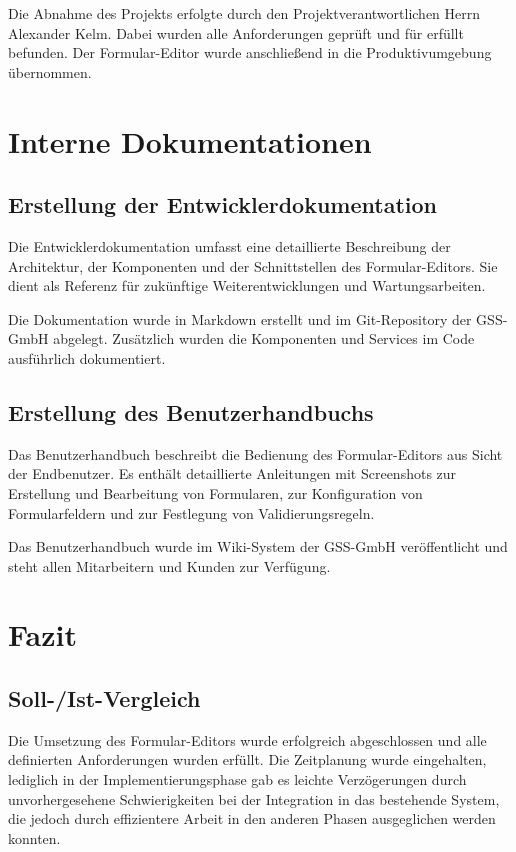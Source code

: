 \documentclass[a4paper,11pt]{article}
\begin{document}
Die Abnahme des Projekts erfolgte durch den Projektverantwortlichen Herrn Alexander Kelm. Dabei wurden alle Anforderungen geprüft und für erfüllt befunden. Der Formular-Editor wurde anschließend in die Produktivumgebung übernommen.

\section{Interne Dokumentationen}

\subsection{Erstellung der Entwicklerdokumentation}

Die Entwicklerdokumentation umfasst eine detaillierte Beschreibung der Architektur, der Komponenten und der Schnittstellen des Formular-Editors. Sie dient als Referenz für zukünftige Weiterentwicklungen und Wartungsarbeiten.

Die Dokumentation wurde in Markdown erstellt und im Git-Repository der GSS-GmbH abgelegt. Zusätzlich wurden die Komponenten und Services im Code ausführlich dokumentiert.

\subsection{Erstellung des Benutzerhandbuchs}

Das Benutzerhandbuch beschreibt die Bedienung des Formular-Editors aus Sicht der Endbenutzer. Es enthält detaillierte Anleitungen mit Screenshots zur Erstellung und Bearbeitung von Formularen, zur Konfiguration von Formularfeldern und zur Festlegung von Validierungsregeln.

Das Benutzerhandbuch wurde im Wiki-System der GSS-GmbH veröffentlicht und steht allen Mitarbeitern und Kunden zur Verfügung.

\section{Fazit}

\subsection{Soll-/Ist-Vergleich}

Die Umsetzung des Formular-Editors wurde erfolgreich abgeschlossen und alle definierten Anforderungen wurden erfüllt. Die Zeitplanung wurde eingehalten, lediglich in der Implementierungsphase gab es leichte Verzögerungen durch unvorhergesehene Schwierigkeiten bei der Integration in das bestehende System, die jedoch durch effizientere Arbeit in den anderen Phasen ausgeglichen werden konnten.
\end{document}
